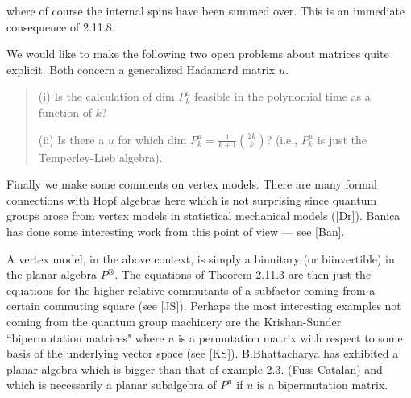 \ni where of course the internal spins have been summed over.
This is an immediate consequence of 2.11.8.

We would like to make the following two open problems about
matrices quite explicit. Both concern a generalized Hadamard matrix
$u$.
\begin{verse}
(i) Is the calculation of dim $P^u_k$ feasible in the
polynomial time as a function of $k$?

(ii) Is there a $u$ for which dim
$P^u_k=\frac{1}{k+1}{2k\choose k}$? (i.e.,
$P^u_k$ is just the Temperley-Lieb algebra).
\end{verse}

Finally we make some comments on vertex models. There are many
formal connections with Hopf algebras here which is not surprising
since quantum groups arose from vertex models in statistical
mechanical models ([Dr]). Banica has done some interesting
work from this point of view --- see [Ban].

A vertex model, in the above context, is simply a biunitary (or
biinvertible) in the planar algebra $P^{\otimes}$. The equations of
Theorem 2.11.3 are then just the equations for the higher relative
commutants of a subfactor coming from a certain commuting square
(see [JS]). Perhaps the most interesting examples not coming from
the quantum group machinery are the Krishan-Sunder ``bipermutation
matrices" where $u$ is a permutation matrix with respect to some
basis of the underlying vector space (see [KS]).
B.Bhattacharya has exhibited a planar algebra which is bigger than
that of example 2.3. (Fuss Catalan) and which is necessarily a
planar subalgebra of $P^u$  if $u$ is a bipermutation matrix.




